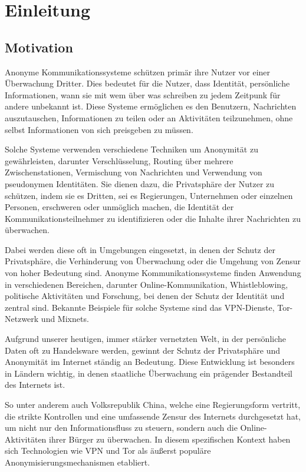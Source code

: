 \section{Einleitung}

\subsection{Motivation}

Anonyme Kommunikationssysteme schützen primär ihre Nutzer vor einer Überwachung Dritter. Dies bedeutet für die Nutzer, dass Identität, persönliche Informationen, wann sie mit wem über was schreiben zu jedem Zeitpunk für andere unbekannt ist. Diese Systeme ermöglichen es den Benutzern, Nachrichten auszutauschen, Informationen zu teilen oder an Aktivitäten teilzunehmen, ohne selbst Informationen von sich preisgeben zu müssen.

Solche Systeme verwenden verschiedene Techniken um Anonymität zu gewährleisten, darunter Verschlüsselung, Routing über mehrere Zwischenstationen, Vermischung von Nachrichten und Verwendung von pseudonymen Identitäten. Sie dienen dazu, die Privatsphäre der Nutzer zu schützen, indem sie es Dritten, sei es Regierungen, Unternehmen oder einzelnen Personen, erschweren oder unmöglich machen, die Identität der Kommunikationsteilnehmer zu identifizieren oder die Inhalte ihrer Nachrichten zu überwachen.

Dabei werden diese oft in Umgebungen eingesetzt, in denen der Schutz der Privatsphäre, die Verhinderung von Überwachung oder die Umgehung von Zensur von hoher Bedeutung sind. Anonyme Kommunikationssysteme finden Anwendung in verschiedenen Bereichen, darunter Online-Kommunikation, Whistleblowing, politische Aktivitäten und Forschung, bei denen der Schutz der Identität und zentral sind. Bekannte Beispiele für solche Systeme sind das VPN-Dienste, Tor-Netzwerk und Mixnets.

Aufgrund unserer heutigen, immer stärker vernetzten Welt, in der persönliche Daten oft zu Handelsware werden, gewinnt der Schutz der Privatsphäre und Anonymität im Internet ständig an Bedeutung. Diese Entwicklung ist besonders in Ländern wichtig, in denen staatliche Überwachung ein prägender Bestandteil des Internets ist.

So unter anderem auch Volksrepublik China, welche eine Regierungsform vertritt, die strikte Kontrollen und eine umfassende Zensur des Internets durchgesetzt hat, um nicht nur den Informationsfluss zu steuern, sondern auch die Online-Aktivitäten ihrer Bürger zu überwachen. In diesem spezifischen Kontext haben sich Technologien wie VPN und Tor als äußerst populäre Anonymisierungsmechanismen etabliert.

